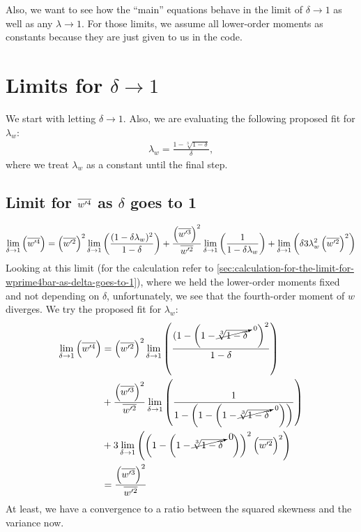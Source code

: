 Also, we want to see how the \enquote{main} equations behave in the limit of $\delta \to 1$
as well as any $\lambda \to 1$.
For those limits, we assume all lower-order moments as constants because they are just given to us in the code.


\section{Limits for \texorpdfstring{$\delta \to 1$}{delta to 1}}
\label{sec:limits-for-delta-to-1}

We start with letting $\delta \to 1$.
Also, we are evaluating the following proposed fit for $\lambda_w$:
\begin{align}
    \lambda_w = \frac{1-\sqrt[3]{1-\delta}}{\delta},
\end{align}
where we treat $\lambda_w$ as a constant until the final step.

\subsection{Limit for \texorpdfstring{$\overline{w'^4}$}{wprime4bar} as \texorpdfstring{$\delta$}{delta} goes to 1}
\label{subsec:limit-for-wprime4bar-as-delta-goes-to-1}

\begin{align}
    \label{eq:limit_wprime4_delta_to_1}
    \lim_{\delta \to 1}\left(\overline{w'^4}\right)
    = \left(\overline{w'^2}\right)^2 \lim_{\delta \to 1} \left(\frac{ (1-\delta \lambda_w)^2}{1-\delta}\right) +
    \frac{\left(\overline{w'^3}\right)^2}{\overline{w'^2}} \lim_{\delta \to 1}\left(\frac{1}{1-\delta \lambda_w} \right) +
    \lim_{\delta \to 1}\left(\delta 3 \lambda_w^2 \left(\overline{w'^2}\right)^2\right)
\end{align}
Looking at this limit (for the calculation refer to \cref{sec:calculation-for-the-limit-for-wprime4bar-as-delta-goes-to-1}),
where we held the lower-order moments fixed and not depending on $\delta$,
unfortunately, we see that the fourth-order moment of $w$ diverges.
We try the proposed fit for $\lambda_w$:
\begin{align}
    \label{eq:limit_wprime4_delta_to_1_lambda_w_fit}
    \lim_{\delta \to 1}\left(\overline{w'^4}\right)
    &= \left(\overline{w'^2}\right)^2
    \lim_{\delta \to 1} \left(\frac{(1 - \left(1-\cancelto{0}{\sqrt[3]{1-\delta}}\quad\right)^2}{1-\delta}\right)
    \\
    &+ \frac{\left(\overline{w'^3}\right)^2}{\overline{w'^2}}
    \lim_{\delta \to 1}\left(\frac{1}{1-\left(1 - \left(1-\cancelto{0}{\sqrt[3]{1-\delta}}\quad\right) \right)} \right)
    \\
    &+ 3
    \lim_{\delta \to 1}\left(\left( 1 - \left(1-\cancelto{0}{\sqrt[3]{1-\delta}}\quad\right) \right)^2 \left(\overline{w'^2}\right)^2\right)
    \\
    &= \frac{\left(\overline{w'^3}\right)^2}{\overline{w'^2}}
\end{align}
At least, we have a convergence to a ratio between the squared skewness and the variance now.

